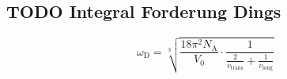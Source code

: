 \subsection{TODO Integral Forderung Dings}
\begin{equation*}
    \omega_\text{D}
    = \sqrt[3]{
        \frac{18 \pi^2 N_\text{A}}{V_0} · \frac{1}{\frac{2}{v_\text{trans}} + \frac{1}{v_\text{long}}}
    }
\end{equation*}
